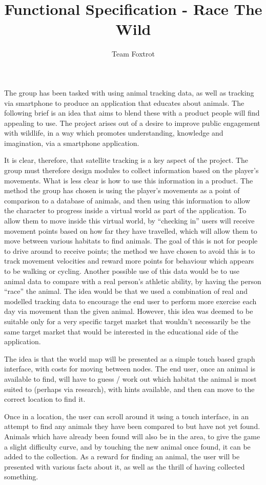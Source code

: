 \documentclass[]{report}
\title{Functional Specification - Race The Wild}
\author{Team Foxtrot}
\begin{document}
\maketitle

The group has been tasked with using animal tracking data, as well as tracking via smartphone to produce an application that educates about animals. The following brief is an idea that aims to blend these with a product people will find appealing to use. The project arises out of a desire to improve public engagement with wildlife, in a way which promotes understanding, knowledge and imagination, via a smartphone application.

It is clear, therefore, that satellite tracking is a key aspect of the project. The group must therefore design modules to collect information based on the player's movements. What is less clear is how to use this information in a product. The method the group has chosen is using the player's movements as a point of comparison to a database of animals, and then using this information to allow the character to progress inside a virtual world as part of the application.  To allow them to move inside this virtual world, by ``checking in'' users will receive movement points based on how far they have travelled, which will allow them to move between various habitats to find animals. The goal of this is not for people to drive around to receive points; the method we have chosen to avoid this is to track movement velocities and reward more points for behaviour which appears to be walking or cycling. Another possible use of this data would be to use animal data to compare with a real person's athletic ability, by having the person ``race'' the animal. The idea would be that we used a combination of real and modelled tracking data to encourage the end user to perform more exercise each day via movement than the given animal. However, this idea was deemed to be suitable only for a very specific target market that wouldn't necessarily be the same target market that would be interested in the educational side of the application.

The idea is that the world map will be presented as a simple touch based graph interface, with costs for moving between nodes. The end user, once an animal is available to find, will have to guess / work out which habitat the animal is most suited to (perhaps via research), with hints available, and then can move to the correct location to find it.

Once in a location, the user can scroll around it using a touch interface, in an attempt to find any animals they have been compared to but have not yet found. Animals which have already been found will also be in the area, to give the game a slight difficulty curve, and by touching the new animal once found, it can be added to the collection. As a reward for finding an animal, the user will be presented with various facts about it, as well as the thrill of having collected something.
\end{document}
